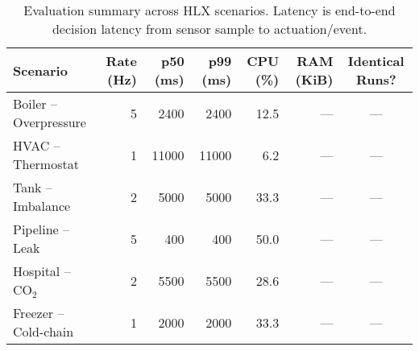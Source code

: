 \begin{table}[t]
\centering
\caption{Evaluation summary across HLX scenarios. Latency is end-to-end decision latency from sensor sample to actuation/event.}
\label{tab:scenarios}
\begin{tabular}{lrrrrrc}
\hline
\textbf{Scenario} & \textbf{Rate (Hz)} & \textbf{p50 (ms)} & \textbf{p99 (ms)} & \textbf{CPU (\%)} & \textbf{RAM (KiB)} & \textbf{Identical Runs?} \\
\hline
Boiler -- Overpressure & 5 & 2400 & 2400 & 12.5 & — & — \\
HVAC -- Thermostat     & 1 & 11000 & 11000 & 6.2 & — & — \\
Tank -- Imbalance      & 2 & 5000 & 5000 & 33.3 & — & — \\
Pipeline -- Leak       & 5 & 400 & 400 & 50.0 & — & — \\
Hospital -- CO$_2$     & 2 & 5500 & 5500 & 28.6 & — & — \\
Freezer -- Cold-chain  & 1 & 2000 & 2000 & 33.3 & — & — \\
\hline
\end{tabular}
\end{table}
